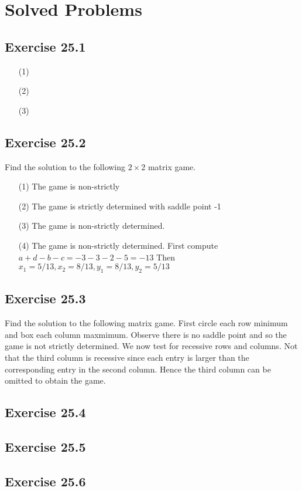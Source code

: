 \documentclass[]{report}
\begin{document}
\section*{Solved Problems}
\subsection{Exercise 25.1}
\begin{itemize}
\item[(1)]
\item[(2)]
\item[(3)]
\end{itemize}
\subsection{Exercise 25.2}
Find the solution to the following $2 \times 2$ matrix game.
\begin{itemize}
\item[(1)] The game is non-strictly
\item[(2)] The game is strictly determined with saddle point -1
\item[(3)] The game is non-strictly determined.
\item[(4)] The game is non-strictly determined. First compute $a+d-b-c = -3-3-2-5 = -13$
Then $x_1 = 5/13, x_2 = 8/13,y_1=8/13,y_2=5/13$
\end{itemize}
\subsection{Exercise 25.3}
Find the solution to the following matrix game.
First circle each row minimum and box each column maxmimum.
Observe there is no saddle point and so the game is not strictly determined.
We now test for recessive rows and columns.
Not that the third column is recessive since each entry is larger than the corresponding entry in the
second column. Hence the third column can be omitted to obtain the game.
\subsection{Exercise 25.4}
\subsection{Exercise 25.5}
\subsection{Exercise 25.6}
\end{document}
